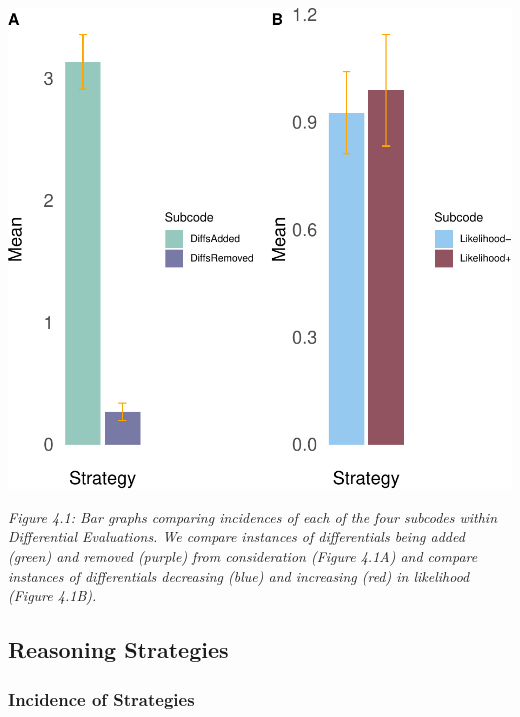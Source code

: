 \documentclass[a4paper, nobind]{templates/ociamthesis}
\begin{document}
\begin{center}\includegraphics[width=1\linewidth]{_main_files/figure-latex/diffbarsplot-1} \end{center}

\emph{Figure 4.1: Bar graphs comparing incidences of each of the four subcodes within Differential Evaluations. We compare instances of differentials being added (green) and removed (purple) from consideration (Figure 4.1A) and compare instances of differentials decreasing (blue) and increasing (red) in likelihood (Figure 4.1B).}

\subsection*{Reasoning Strategies}\label{reasoning-strategies}

\subsubsection*{Incidence of Strategies}\label{incidence-of-strategies}
\end{document}
